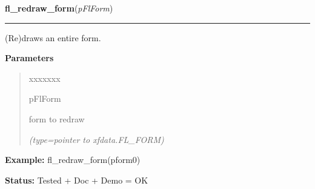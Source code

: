 \hspace{.8\funcindent}\begin{boxedminipage}{\funcwidth}

    \raggedright \textbf{fl\_redraw\_form}(\textit{pFlForm})

    \vspace{-1.5ex}

    \rule{\textwidth}{0.5\fboxrule}
\setlength{\parskip}{2ex}
    (Re)draws an entire form.

\setlength{\parskip}{1ex}
      \textbf{Parameters}
      \vspace{-1ex}

      \begin{quote}
        \begin{Ventry}{xxxxxxx}

          \item[pFlForm]

          form to redraw

            {\it (type=pointer to xfdata.FL\_FORM)}

        \end{Ventry}

      \end{quote}

\textbf{Example:} fl\_redraw\_form(pform0)



\textbf{Status:} Tested + Doc + Demo = OK



    \end{boxedminipage}

    \label{xformslib:flbasic:fl_set_form_dblbuffer}

    \vspace{0.5ex}

